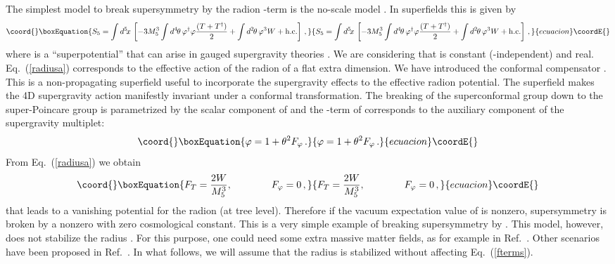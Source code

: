 \documentclass[a4paper,12pt]{article}
\begin{document}
The simplest model to break supersymmetry 
by the radion \coordHE{}-term is the no-scale model \cite{noscale}.
In 
superfields this is given by
\begin{equation}\coord{}\boxEquation{
S_5=\int d^{5}\! x\, \left[-3
M^3_5\int d^4\mspace{-2mu}\theta\,
 \varphi^\dagger\varphi\frac{(T+T^\dagger)}{2}+
\int d^2\mspace{-2mu}\theta\, \varphi^3 W+\text{h.c.}\right]\, ,
\label{radiusa}
}{
S_5=\int d^{5}\! x\, \left[-3
M^3_5\int d^4\mspace{-2mu}\theta\,
 \varphi^\dagger\varphi\frac{(T+T^\dagger)}{2}+
\int d^2\mspace{-2mu}\theta\, \varphi^3 W+\text{h.c.}\right]\, ,
}{ecuacion}\coordE{}\end{equation}
where \coordHE{} is a  ``superpotential'' 
that can arise in gauged supergravity
theories \cite{W}. 
We are considering that  \coordHE{} is constant (\coordHE{}-independent) and real.
Eq.~(\ref{radiusa}) corresponds to the effective action of the radion
of  a flat extra dimension.
We
have introduced  
the conformal compensator \myHighlight{$\varphi$}\coordHE{} \cite{compensator}. 
This is a non-propagating superfield
useful to incorporate the supergravity effects to the effective 
radion potential. 
The superfield  \myHighlight{$\varphi$}\coordHE{} makes the 4D supergravity action manifestly 
invariant under a conformal transformation.
The breaking of  the superconformal group down to the 
super-Poincare group is parametrized by the scalar component of \myHighlight{$\varphi$}\coordHE{}
and the  \coordHE{}-term of \myHighlight{$\varphi$}\coordHE{} corresponds to
the auxiliary component of the supergravity multiplet:
\begin{equation}\coord{}\boxEquation{
\varphi=1+\theta^2 F_\varphi\, .
}{
\varphi=1+\theta^2 F_\varphi\, .
}{ecuacion}\coordE{}\end{equation}
{}From Eq.~(\ref{radiusa}) we obtain
\begin{equation}\coord{}\boxEquation{
F_T=\frac{2W}{M^3_5},\qquad\qquad  F_\varphi=0\, ,
\label{fterms}
}{
F_T=\frac{2W}{M^3_5},\qquad\qquad  F_\varphi=0\, ,
}{ecuacion}\coordE{}\end{equation}
that leads to a vanishing potential for the radion (at tree level).
Therefore if the vacuum expectation value 
of \coordHE{} is nonzero, supersymmetry is broken 
by a nonzero \coordHE{} with zero cosmological constant.
This is  a very simple example of breaking supersymmetry
by \coordHE{}. 
This model, however, does not stabilize  the radius \coordHE{}. 
For this purpose,
one could need some extra massive matter fields, 
as for example in Ref.~\cite{pop}.
Other scenarios have been proposed in 
Ref.~\cite{ls}.
In what follows, we will assume 
that the radius is stabilized without affecting Eq.~(\ref{fterms}).
\end{document}

